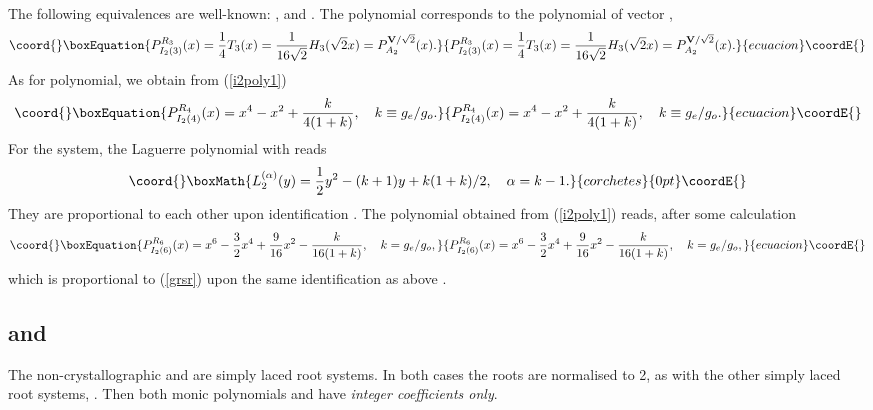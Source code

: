 \documentclass[a4paper,12pt]{article}
\begin{document}
The following equivalences are well-known: \coordHE{},
\coordHE{} and \coordHE{}. The \coordHE{} polynomial
corresponds to the \coordHE{} polynomial of vector \coordHE{},
\begin{equation}\coord{}\boxEquation{
   P_{I_2(3)}^{R_3}(x)=\frac14T_3(x)
   =\frac{1}{16\sqrt{2}}H_3(\sqrt{2}x)=P_{A_2}^{{\bf V}/\sqrt{2}}(x).
}{
   P_{I_2(3)}^{R_3}(x)=\frac14T_3(x)
   =\frac{1}{16\sqrt{2}}H_3(\sqrt{2}x)=P_{A_2}^{{\bf V}/\sqrt{2}}(x).
}{ecuacion}\coordE{}\end{equation}
As for \coordHE{} polynomial, we obtain from (\ref{i2poly1})
\begin{equation}\coord{}\boxEquation{
   P_{I_2(4)}^{R_4}(x)=x^4-x^2 +{k\over{4(1+k)}},\quad k\equiv g_e/g_o.
}{
   P_{I_2(4)}^{R_4}(x)=x^4-x^2 +{k\over{4(1+k)}},\quad k\equiv g_e/g_o.
}{ecuacion}\coordE{}\end{equation}
For the \coordHE{} system,
the Laguerre polynomial with \coordHE{} reads
\[\coord{}\boxMath{
   L_2^{(\alpha)}(y)={1\over2}y^2-(k+1)y+{k(1+k)/2},\quad \alpha=k-1.
}{corchetes}{0pt}\coordE{}\]
They are proportional to each other upon identification \coordHE{}.
The \coordHE{} polynomial obtained from (\ref{i2poly1}) reads,
after some calculation
\begin{equation}\coord{}\boxEquation{
   P_{I_2(6)}^{R_6}(x)=x^6-{3\over2}x^4+{9\over{16}}x^2-
   {k\over{16(1+k)}},\quad k=g_e/g_o,
}{
   P_{I_2(6)}^{R_6}(x)=x^6-{3\over2}x^4+{9\over{16}}x^2-
   {k\over{16(1+k)}},\quad k=g_e/g_o,
}{ecuacion}\coordE{}\end{equation}
which is proportional to \coordHE{} (\ref{grsr}) upon the same
identification as above \coordHE{}.

\subsection{\coordHE{} and \coordHE{}}

The non-crystallographic \coordHE{} and \coordHE{} are  simply laced root systems.
In both cases the roots are normalised to 2, as with the other simply
laced root systems, \coordHE{}.
Then both monic  polynomials \coordHE{} and
\coordHE{} have {\em integer coefficients only\/}.
\end{document}
